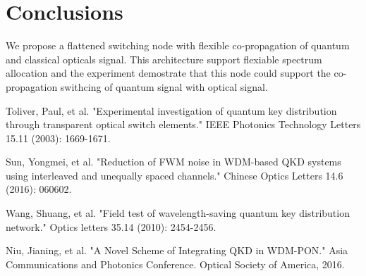 \documentclass[letterpaper,10pt]{article}
\begin{document}
\section{Conclusions}
We propose a flattened switching node with flexible co-propagation of quantum and classical opticals signal. This architecture support flexiable spectrum allocation and the experiment demostrate that this node could support the co-propagation swithcing of quantum signal with optical signal.

\begin{thebibliography}{99}

 Toliver, Paul, et al. "Experimental investigation of quantum key distribution through transparent optical switch elements." IEEE Photonics Technology Letters 15.11 (2003): 1669-1671.

 Sun, Yongmei, et al. "Reduction of FWM noise in WDM-based QKD systems using interleaved and unequally spaced channels." Chinese Optics Letters 14.6 (2016): 060602.

 Wang, Shuang, et al. "Field test of wavelength-saving quantum key distribution network." Optics letters 35.14 (2010): 2454-2456.


 Niu, Jianing, et al. "A Novel Scheme of Integrating QKD in WDM-PON." Asia Communications and Photonics Conference. Optical Society of America, 2016.

\end{thebibliography}
\end{document}
